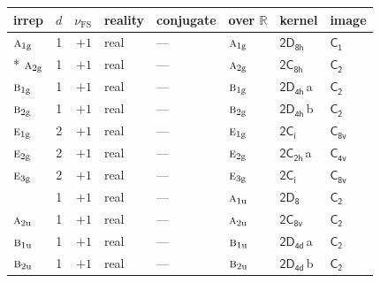 \documentclass[10pt,a4paper]{article}
\numberwithin{equation}{section}
\newcommand{\grp}[1]{\mathsf{#1}}
\newcommand{\irr}[1]{\text{\normalfont\scshape #1}}
\newcommand{\detbox}[1]{{\setlength{\fboxsep}{1pt}\fbox{#1}}}
\newcommand{\ptag}[1]{\mathrm{#1}}
\newcommand{\clsletter}[1]{\,{\scriptsize\color{black!55}#1}}
\newcommand{\fsind}{\nu_{\mathrm{FS}}}
\begin{document}
\setlength{\emergencystretch}{2em}\par\setlength{\emergencystretch}{0pt}
{\small\renewcommand{\arraystretch}{1.25}\setlength{\tabcolsep}{4pt}\begin{longtable}{@{}lrrlllll@{}}\toprule
irrep & $d$ & $\fsind$ & reality & conjugate & over $\mathbb{R}$ & kernel & image\\\midrule\endhead
\bottomrule\endfoot\endlastfoot
$\irr{a}_{1\ptag{g}}$ & 1 & $+1$ & real & --- & $\irr{a}_{1\ptag{g}}$ & \href{2D8h.pdf}{$\grp{2D_{8h}}$} & \href{../../../rotation/data/pdf/C1.pdf}{$\grp{C_{1}}$}\\*
$\irr{a}_{2\ptag{g}}$ & 1 & $+1$ & real & --- & $\irr{a}_{2\ptag{g}}$ & \href{2C8h.pdf}{$\grp{2C_{8h}}$} & \href{../../../rotation/data/pdf/C2.pdf}{$\grp{C_{2}}$}\\
$\irr{b}_{1\ptag{g}}$ & 1 & $+1$ & real & --- & $\irr{b}_{1\ptag{g}}$ & \href{2D4h.pdf}{$\grp{2D_{4h}}$}\clsletter{a} & \href{../../../rotation/data/pdf/C2.pdf}{$\grp{C_{2}}$}\\
$\irr{b}_{2\ptag{g}}$ & 1 & $+1$ & real & --- & $\irr{b}_{2\ptag{g}}$ & \href{2D4h.pdf}{$\grp{2D_{4h}}$}\clsletter{b} & \href{../../../rotation/data/pdf/C2.pdf}{$\grp{C_{2}}$}\\
$\irr{e}_{1\ptag{g}}$ & 2 & $+1$ & real & --- & $\irr{e}_{1\ptag{g}}$ & \href{2S2.pdf}{$\grp{2C_{i}}$} & \href{../../../rotation/data/pdf/C8v.pdf}{$\grp{C_{8v}}$}\\
$\irr{e}_{2\ptag{g}}$ & 2 & $+1$ & real & --- & $\irr{e}_{2\ptag{g}}$ & \href{2C2h.pdf}{$\grp{2C_{2h}}$}\clsletter{a} & \href{../../../rotation/data/pdf/C4v.pdf}{$\grp{C_{4v}}$}\\
$\irr{e}_{3\ptag{g}}$ & 2 & $+1$ & real & --- & $\irr{e}_{3\ptag{g}}$ & \href{2S2.pdf}{$\grp{2C_{i}}$} & \href{../../../rotation/data/pdf/C8v.pdf}{$\grp{C_{8v}}$}\\
\detbox{$\irr{a}_{1\ptag{u}}$} & 1 & $+1$ & real & --- & $\irr{a}_{1\ptag{u}}$ & \href{2D8.pdf}{$\grp{2D_{8}}$} & \href{../../../rotation/data/pdf/C2.pdf}{$\grp{C_{2}}$}\\
$\irr{a}_{2\ptag{u}}$ & 1 & $+1$ & real & --- & $\irr{a}_{2\ptag{u}}$ & \href{2C8v.pdf}{$\grp{2C_{8v}}$} & \href{../../../rotation/data/pdf/C2.pdf}{$\grp{C_{2}}$}\\
$\irr{b}_{1\ptag{u}}$ & 1 & $+1$ & real & --- & $\irr{b}_{1\ptag{u}}$ & \href{2D4d.pdf}{$\grp{2D_{4d}}$}\clsletter{a} & \href{../../../rotation/data/pdf/C2.pdf}{$\grp{C_{2}}$}\\
$\irr{b}_{2\ptag{u}}$ & 1 & $+1$ & real & --- & $\irr{b}_{2\ptag{u}}$ & \href{2D4d.pdf}{$\grp{2D_{4d}}$}\clsletter{b} & \href{../../../rotation/data/pdf/C2.pdf}{$\grp{C_{2}}$}\\

\end{longtable}}
\end{document}
